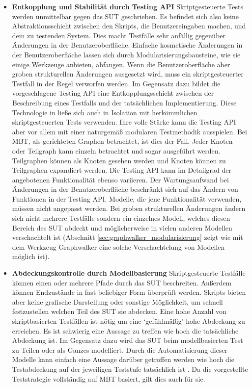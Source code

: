 \begin{itemize}
\item \textbf{Entkopplung und Stabilität durch Testing API}  Skriptgesteuerte Tests werden unmittelbar gegen das \Gls{SUT} geschrieben. Es befindet sich also keine Abstraktionsschicht zwischen den Skripts, die Benutzereingaben machen, und dem zu testenden System. Dies macht Testfälle sehr anfällig gegenüber Änderungen in der Benutzeroberfläche. Einfache kosmetische Änderungen in der Benutzeroberfläche lassen sich durch Modularisierungsbausteine, wie sie einige Werkzeuge anbieten, abfangen. Wenn die Benutzeroberfläche aber groben strukturellen Änderungen ausgesetzt wird, muss ein skriptgesteuerter Testfall in der Regel verworfen werden. Im Gegensatz dazu bildet die vorgeschlagene Testing API eine Entkopplungsschicht zwischen der Beschreibung eines Testfalls und der tatsächlichen Implementierung. Diese Technologie in ließe sich auch in Isolation mit herkömmlichen skriptgesteuerten Tests verwenden. Ihre volle Stärke kann die Testing API aber vor allem mit einer naturgemäß modularen Testmethodik ausspielen. Bei \Gls{MBT}, als gerichteten Graphen betrachtet, ist dies der Fall. Jeder Knoten oder Teilgraph kann einzeln betrachtet und sogar ausgeführt werden. Teilgraphen können als Knoten gesehen werden und Knoten können zu Teilgraphen expandiert werden. Die Testing API kann im Detailgrad der angebotenen Funktionalität ebenso variieren. Der Wartungsaufwand bei Änderungen in der Benutzeroberfläche beschränkt sich auf das Ändern von Funktionen in der Testing API. Modelle, die jene Funktionalität verwenden, müssen nicht angepasst werden. Bei groben strukturellen Änderungen ändern sich nicht mehrere Testfälle sondern ein einzelnes Modell, welches diesen Bereich des \Gls{SUT} abdeckt und möglicherweise in vielen anderen Modellen verschachtelt ist (Abschnitt \ref{sec:graphwalker_modularisierung} zeigt wie mit dem Werkzeug Graphwalker eine solche Verschachtelung von Modellen möglich ist).
\item \textbf{Abdeckungskontrolle durch Modellbasierung} Skriptgesteuerte Testfälle können einen oder mehrere Pfade durch das \Gls{SUT} beschreiten. Außerdem können Endzustände in fast beliebiger Form überprüft werden. Skripts bieten aber keine grafische Darstellung oder sonstige Möglichkeit, um schnell festzustellen welchen Teil des \Gls{SUT} sie abdecken. Eine hohe Anzahl von skriptbasierten Testfällen ist nötig um eine `gefühlmäßig' hohe Abdeckung zu erreichen. Es ist schwierig eine Aussage zu treffen wie hoch die tatsächliche Abdeckung ist. Im Gegensatz dazu wird das \Gls{SUT} beim modellbasierten Test zu Teilen oder als Ganzes modelliert. Durch die Automatisierung dieser Modelle kann einfach eine Aussage darüber getroffen werden wie hoch die Testabdeckung auf der jeweiligen Teststufe tatsächlich ist \cite{utting_practical_2007}. Da die vorgestellte Teststrategie vollständig auf \Gls{MBT} basiert, gilt dies auch für sie. 

\end{itemize}
